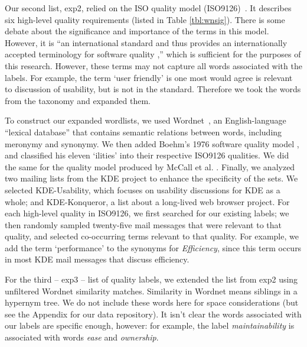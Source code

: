 \documentclass{acm_proc_article-sp}
\begin{document}
Our second list, \textsf{exp2}, relied on the ISO quality model (ISO9126)~\cite{iso9126}. It describes six high-level quality requirements (listed in Table \ref{tbl:wnsig}). There is some debate about the significance and importance of the terms in this model. However, it is ``an international standard and thus provides an internationally accepted terminology for software quality \cite[p. 58]{Bøegh2008},'' which is sufficient for the purposes of this research. However, these terms may not capture all words associated with the labels.  For example, the term ‘user friendly’ is one most would agree is relevant to discussion of usability, but is not in the standard. Therefore we took the words from the taxonomy and expanded them.


To construct our expanded wordlists, we used Wordnet~\cite{Fellbaum1998}, an English-language ``lexical database'' that contains semantic relations between words, including meronymy and synonymy. We then added Boehm’s 1976 software quality model \cite{Boehm+:1976:ICSE}, and classified his eleven ‘ilities’ into their respective ISO9126 qualities. We did the same for the quality model produced by McCall et al. \cite{mccall1977}. Finally, we analyzed two mailing lists from the KDE project to enhance the specificity of the sets. We selected KDE-Usability, which focuses on usability discussions for KDE as a whole; and KDE-Konqueror, a list about a long-lived web browser project. For each high-level quality in ISO9126, we first searched for our existing labels; we then randomly sampled twenty-five mail messages that were relevant to that quality, and selected co-occurring terms relevant to that quality. For example, we add the term ‘performance’ to the synonyms for \emph{Efficiency}, since this term occurs in most KDE mail messages that discuss efficiency.

For the third -- \textsf{exp3} -- list of quality labels, we extended the list from \textsf{exp2} using unfiltered Wordnet similarity matches. Similarity in Wordnet means siblings in a hypernym tree. We do not include these words here for space considerations (but see the Appendix for our data repository). It isn't clear the words associated with our labels are specific enough, however: for example, the label \emph{maintainability} is associated with words \emph{ease} and \emph{ownership}.
\end{document}
